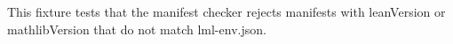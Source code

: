This fixture tests that the manifest checker rejects manifests with leanVersion or mathlibVersion that do not match lml-env.json.

